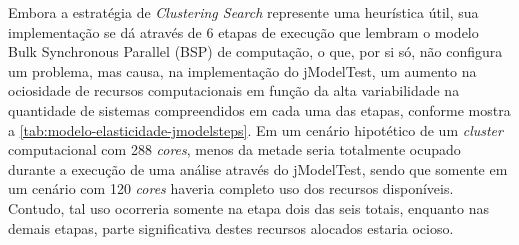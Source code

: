 \documentclass[english,brazilian]{UNISINOSmonografia} %
\begin{document}
Embora a estratégia de \textit{Clustering Search} represente uma heurística útil, sua implementação se dá através de 6 etapas de execução que lembram o modelo Bulk Synchronous Parallel (BSP) de computação, o que, por si só, não configura um problema, mas causa, na implementação do jModelTest, um aumento na ociosidade de recursos computacionais em função da alta variabilidade na quantidade de sistemas compreendidos em cada uma das etapas, conforme mostra a \autoref{tab:modelo-elasticidade-jmodelsteps}.
Em um cenário hipotético de um \textit{cluster} computacional com 288 \textit{cores}, menos da metade seria totalmente ocupado durante a execução de uma análise através do jModelTest, sendo que somente em um cenário com 120 \textit{cores} haveria completo uso dos recursos disponíveis.
Contudo, tal uso ocorreria somente na etapa dois das seis totais, enquanto nas demais etapas, parte significativa destes recursos alocados estaria ocioso.
\end{document}
